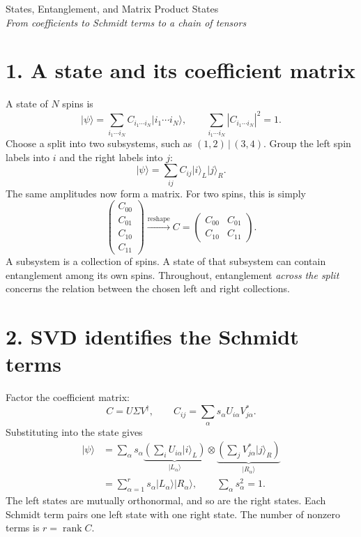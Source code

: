 \documentclass[11pt]{article}
\newcommand{\ket}[1]{\lvert #1\rangle}
\newcommand{\mtwo}[4]{\begin{pmatrix}#1&#2\\#3&#4\end{pmatrix}}
\begin{document}
\begin{center}
{\Large States, Entanglement, and Matrix Product States}\\[5pt]
\textit{From coefficients to Schmidt terms to a chain of tensors}
\end{center}

\section*{1. A state and its coefficient matrix}
A state of $N$ spins is
\begin{equation}
\ket\psi=\sum_{i_1\cdots i_N}C_{i_1\cdots i_N}\ket{i_1\cdots i_N},
\qquad \sum_{i_1\cdots i_N}|C_{i_1\cdots i_N}|^2=1.
\end{equation}
Choose a split into two subsystems, such as $(1,2)\,|\,(3,4)$. Group the left spin labels into $i$ and the right labels into $j$:
\begin{equation}
\ket\psi=\sum_{ij}C_{ij}\ket i_L\ket j_R.
\end{equation}
The same amplitudes now form a matrix. For two spins, this is simply
\begin{equation}
\begin{pmatrix}C_{00}\\C_{01}\\C_{10}\\C_{11}\end{pmatrix}
\xrightarrow{\text{reshape}}
C=\mtwo{C_{00}}{C_{01}}{C_{10}}{C_{11}}.
\end{equation}
A subsystem is a collection of spins. A state of that subsystem can contain entanglement among its own spins. Throughout, entanglement \emph{across the split} concerns the relation between the chosen left and right collections.

\section*{2. SVD identifies the Schmidt terms}
Factor the coefficient matrix:
\begin{equation}
C=U\Sigma V^\dagger,\qquad
C_{ij}=\sum_\alpha s_\alpha U_{i\alpha}V^*_{j\alpha}.
\end{equation}
Substituting into the state gives
\begin{align}
\ket\psi
&=\sum_\alpha s_\alpha
\underbrace{\left(\sum_iU_{i\alpha}\ket i_L\right)}_{\ket{L_\alpha}}
\otimes\underbrace{\left(\sum_jV^*_{j\alpha}\ket j_R\right)}_{\ket{R_\alpha}}\\
&=\sum_{\alpha=1}^r s_\alpha\ket{L_\alpha}\ket{R_\alpha},
\qquad \sum_\alpha s_\alpha^2=1.
\end{align}
The left states are mutually orthonormal, and so are the right states. Each Schmidt term pairs one left state with one right state. The number of nonzero terms is $r=\operatorname{rank}C$.
\end{document}
